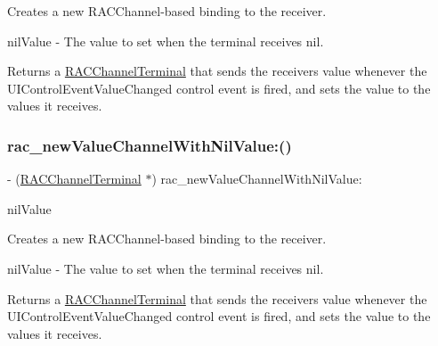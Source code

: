 Creates a new R\+A\+C\+Channel-\/based binding to the receiver.

nil\+Value -\/ The value to set when the terminal receives {\ttfamily nil}.

Returns a \mbox{\hyperlink{interface_r_a_c_channel_terminal}{R\+A\+C\+Channel\+Terminal}} that sends the receiver\textquotesingle{}s value whenever the U\+I\+Control\+Event\+Value\+Changed control event is fired, and sets the value to the values it receives. \mbox{\label{category_u_i_slider_07_r_a_c_signal_support_08_af2aad34ed73884114a89e932e178afe4}} 
\subsubsection{\texorpdfstring{rac\+\_\+new\+Value\+Channel\+With\+Nil\+Value\+:()}{rac\_newValueChannelWithNilValue:()}\hspace{0.1cm}{\footnotesize\ttfamily [2/3]}}
{\footnotesize\ttfamily -\/ (\mbox{\hyperlink{interface_r_a_c_channel_terminal}{R\+A\+C\+Channel\+Terminal}} $\ast$) rac\+\_\+new\+Value\+Channel\+With\+Nil\+Value\+: \begin{DoxyParamCaption}\item[{(N\+S\+Number $\ast$)}]{nil\+Value }\end{DoxyParamCaption}}

Creates a new R\+A\+C\+Channel-\/based binding to the receiver.

nil\+Value -\/ The value to set when the terminal receives {\ttfamily nil}.

Returns a \mbox{\hyperlink{interface_r_a_c_channel_terminal}{R\+A\+C\+Channel\+Terminal}} that sends the receiver\textquotesingle{}s value whenever the U\+I\+Control\+Event\+Value\+Changed control event is fired, and sets the value to the values it receives. \mbox{\label{category_u_i_slider_07_r_a_c_signal_support_08_af2aad34ed73884114a89e932e178afe4}} 
